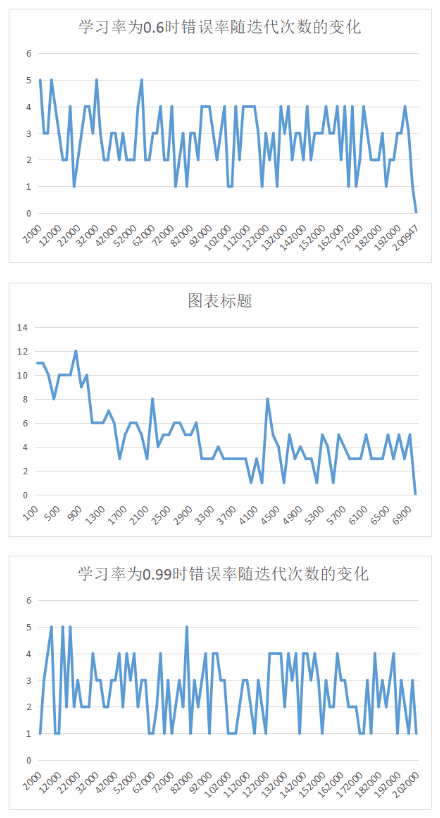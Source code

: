 \documentclass[10pt,a4paper]{ctexart}
\begin{document}
    \begin{figure}[htbp]
  \centering
  \includegraphics[width=1\textwidth]{1.06.png}
    \end{figure}
    \begin{figure}[htbp]
  \centering
  \includegraphics[width=1\textwidth]{1.08.png}
    \end{figure}
    \begin{figure}[htbp]
  \centering
  \includegraphics[width=1\textwidth]{1.99.png}
    \end{figure}
\end{document}
